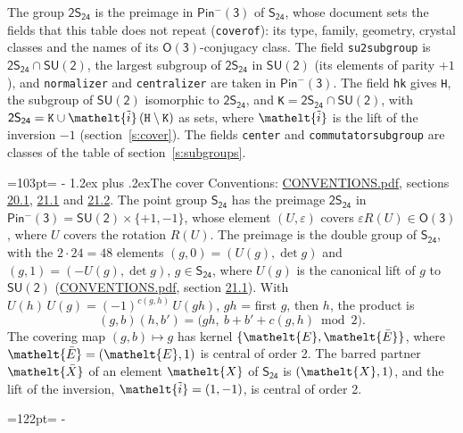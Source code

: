 \documentclass[10pt,a4paper]{article}
\makeatletter
\renewcommand\section{\@startsection{section}{1}{\z@}{-3ex plus -1ex minus -.2ex}%
  {1.2ex plus .2ex}{\normalfont\large\sffamily\bfseries\color{parttitle}}}
\newcommand{\needspace}[1]{\par\penalty-100\begingroup\dimen0=#1\relax\dimen2=\pagegoal
  \advance\dimen2-\pagetotal\ifdim\dimen0>\dimen2\relax\ifdim\dimen2>0pt\vfil\break\fi\fi
  \endgroup}
\numberwithin{equation}{section}
\newcommand{\eltfont}[1]{{\let\sigma\eltsigma\mathelt{#1}}}
\newcommand{\grp}[1]{\mathsf{#1}}
\newcommand{\elt}[1]{\eltfont{#1}}
\newcommand{\dirprod}{\times}
\newcommand{\barred}[1]{\bar{#1}}
\newcommand{\lift}[1]{\tilde{#1}}
\makeatother
\begin{document}
\leavevmode\label{n:element.inversion}\label{n:group.preimage}The group $\grp{2S_{24}}$ is the preimage in $\grp{Pin^{-}(3)}$ of \href{../../../rotation/data/pdf/S24.pdf}{$\grp{S_{24}}$}, whose document sets the fields that this table does not repeat (\texttt{coverof}): its type, family, geometry, crystal classes and the names of its \href{../../../rotation/data/pdf/O3.pdf}{$\grp{O(3)}$}-conjugacy class. The field \texttt{su2subgroup} is $\grp{2S_{24}} \cap \grp{SU(2)}$, the largest subgroup of $\grp{2S_{24}}$ in $\grp{SU(2)}$ (its elements of parity $+1$), and \texttt{normalizer} and \texttt{centralizer} are taken in $\grp{Pin^{-}(3)}$. The field \texttt{hk} gives \texttt{H}, the subgroup of $\grp{SU(2)}$ isomorphic to $\grp{2S_{24}}$, and \texttt{K}${} = \grp{2S_{24}} \cap \grp{SU(2)}$, with $\grp{2S_{24}} = \texttt{K} \cup \elt{\lift{i}}\,(\texttt{H} \setminus \texttt{K})$ as sets, where $\elt{\lift{i}}$ is the lift of the inversion $-1$ (section~\ref{s:cover}). The fields \texttt{center} and \texttt{commutatorsubgroup} are classes of the table of section~\ref{s:subgroups}.
\needspace{103pt}
\section{The cover}\label{s:cover}
Conventions: \href{../../CONVENTIONS.pdf}{CONVENTIONS.pdf}, sections \href{../../CONVENTIONS.pdf\#conv.20.1}{20.1}, \href{../../CONVENTIONS.pdf\#conv.21.1}{21.1} and \href{../../CONVENTIONS.pdf\#conv.21.2}{21.2}.
\leavevmode\label{n:group.pin.minus}\label{n:group.su2}\label{n:local.pin.sign}\label{n:matrix.covered}\label{n:matrix.lift.su2}\label{n:index.bar}The point group $\grp{S_{24}}$ has the preimage $\grp{2S_{24}}$ in $\grp{Pin^{-}(3)} = \grp{SU(2)} \dirprod \{+1, -1\}$, whose element $(U, \varepsilon)$ covers $\varepsilon R(U) \in \grp{O(3)}$, where $U$ covers the rotation $R(U)$. The preimage is the double group of $\grp{S_{24}}$, with the $2 \cdot 24 = 48$ elements $(g, 0) = (U(g), \det g)$ and $(g, 1) = (-U(g), \det g)$, $g \in \grp{S_{24}}$, where $U(g)$ is the canonical lift of $g$ to $\grp{SU(2)}$ (\href{../../CONVENTIONS.pdf}{CONVENTIONS.pdf}, section \href{../../CONVENTIONS.pdf\#conv.21.1}{21.1}). \label{n:function.cocycle}With $U(h)\,U(g) = (-1)^{c(g,h)}\,U(gh)$, $gh$ = first $g$, then $h$, the product is
\begin{equation}\label{e:product}(g, b)(h, b') = \bigl(gh,\ b + b' + c(g, h) \bmod 2\bigr).\end{equation}
\leavevmode\label{n:mark.bar}The covering map $(g, b) \mapsto g$ has kernel $\{\elt{E}, \elt{\barred{E}}\}$, where $\elt{\barred{E}} = (\elt{E}, 1)$ is central of order 2. \label{n:element.named}\label{n:mark.lift}The barred partner $\elt{\barred{X}}$ of an element $\elt{X}$ of $\grp{S_{24}}$ is $(\elt{X}, 1)$, and the lift of the inversion, $\elt{\lift{i}} = (1, -1)$, is central of order 2.
\needspace{122pt}
\end{document}
